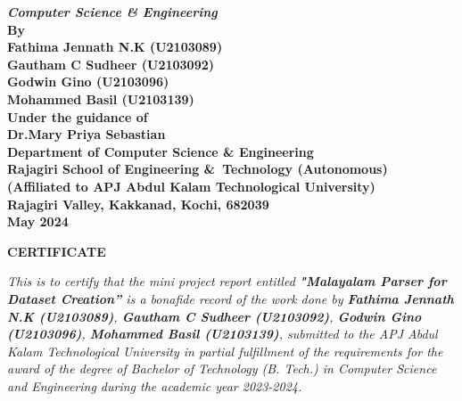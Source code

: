 \documentclass[12pt,a4paper,titlepage]{report}
\begin{document}
\begin{center}
		{\Large \bf \itshape{{Computer\; Science\; \&\; Engineering}}}\\[0.4cm]
		\large \bfseries{By}\\[.4cm]
		\large \bfseries{ Fathima Jennath N.K (U2103089) }\\[0.2cm]
		\large \bfseries{ Gautham C Sudheer (U2103092) }\\[0.2cm]
		\large \bfseries{ Godwin Gino (U2103096) }\\[0.2cm]
		\large \bfseries{ Mohammed Basil (U2103139) }\\[0.6cm]
		\large \bfseries{Under the guidance of}\\[0.75cm]
		\large \bfseries{Dr.Mary Priya Sebastian}\\[0.75cm]
		\large \textbf{Department of Computer\; Science\; \&\; Engineering}\\
		\large \textbf{Rajagiri School of Engineering \&\ Technology (Autonomous)}\\
		\small \bfseries{(Affiliated to APJ Abdul Kalam Technological University)}\\
		\large \textbf{Rajagiri Valley, Kakkanad, Kochi, 682039}\\
		\large \bfseries{May 2024}
	\end{center}
	
	\newpage
	\thispagestyle{empty}
	\begin{center}
	
		\large \bfseries{\huge{CERTIFICATE}}\\[5cm]
	\end{center}
	
	\renewcommand{\baselinestretch}{1.2}\normalsize
	
	\emph{This is to certify that the mini project report entitled \textbf{"Malayalam Parser for Dataset Creation”} is a bonafide record of the work done by \textbf{Fathima Jennath N.K (U2103089)}, \textbf{Gautham C Sudheer (U2103092)}, \textbf{Godwin Gino (U2103096)}, \textbf{Mohammed Basil (U2103139)}, submitted to the APJ Abdul Kalam Technological University in 
		partial fulfillment of the requirements for the award of the degree of Bachelor of Technology (B. Tech.) in Computer Science and Engineering during the academic year 2023-2024.}\\[2.5cm]
	
\end{document}
